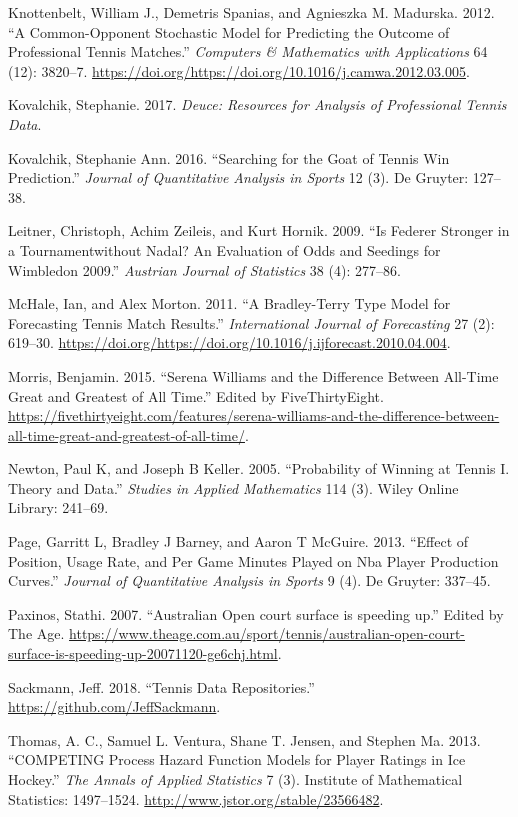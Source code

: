 \documentclass[]{article}
\begin{document}
\leavevmode\hypertarget{ref-knottenbelt2012}{}%
Knottenbelt, William J., Demetris Spanias, and Agnieszka M. Madurska.
2012. ``A Common-Opponent Stochastic Model for Predicting the Outcome of
Professional Tennis Matches.'' \emph{Computers \& Mathematics with
Applications} 64 (12): 3820--7.
\url{https://doi.org/https://doi.org/10.1016/j.camwa.2012.03.005}.

\leavevmode\hypertarget{ref-deuce2017}{}%
Kovalchik, Stephanie. 2017. \emph{Deuce: Resources for Analysis of
Professional Tennis Data}.

\leavevmode\hypertarget{ref-kovalchik2016}{}%
Kovalchik, Stephanie Ann. 2016. ``Searching for the Goat of Tennis Win
Prediction.'' \emph{Journal of Quantitative Analysis in Sports} 12 (3).
De Gruyter: 127--38.

\leavevmode\hypertarget{ref-leitner2009}{}%
Leitner, Christoph, Achim Zeileis, and Kurt Hornik. 2009. ``Is Federer
Stronger in a Tournamentwithout Nadal? An Evaluation of Odds and
Seedings for Wimbledon 2009.'' \emph{Austrian Journal of Statistics} 38
(4): 277--86.

\leavevmode\hypertarget{ref-mchale2011}{}%
McHale, Ian, and Alex Morton. 2011. ``A Bradley-Terry Type Model for
Forecasting Tennis Match Results.'' \emph{International Journal of
Forecasting} 27 (2): 619--30.
\url{https://doi.org/https://doi.org/10.1016/j.ijforecast.2010.04.004}.

\leavevmode\hypertarget{ref-five2015}{}%
Morris, Benjamin. 2015. ``Serena Williams and the Difference Between
All-Time Great and Greatest of All Time.'' Edited by FiveThirtyEight.
\url{https://fivethirtyeight.com/features/serena-williams-and-the-difference-between-all-time-great-and-greatest-of-all-time/}.

\leavevmode\hypertarget{ref-newton2005}{}%
Newton, Paul K, and Joseph B Keller. 2005. ``Probability of Winning at
Tennis I. Theory and Data.'' \emph{Studies in Applied Mathematics} 114
(3). Wiley Online Library: 241--69.

\leavevmode\hypertarget{ref-page2013}{}%
Page, Garritt L, Bradley J Barney, and Aaron T McGuire. 2013. ``Effect
of Position, Usage Rate, and Per Game Minutes Played on Nba Player
Production Curves.'' \emph{Journal of Quantitative Analysis in Sports} 9
(4). De Gruyter: 337--45.

\leavevmode\hypertarget{ref-theage2007}{}%
Paxinos, Stathi. 2007. ``Australian Open court surface is speeding up.''
Edited by The Age.
\url{https://www.theage.com.au/sport/tennis/australian-open-court-surface-is-speeding-up-20071120-ge6chj.html}.

\leavevmode\hypertarget{ref-sackmann2018}{}%
Sackmann, Jeff. 2018. ``Tennis Data Repositories.''
\url{https://github.com/JeffSackmann}.

\leavevmode\hypertarget{ref-thomas2013}{}%
Thomas, A. C., Samuel L. Ventura, Shane T. Jensen, and Stephen Ma. 2013.
``COMPETING Process Hazard Function Models for Player Ratings in Ice
Hockey.'' \emph{The Annals of Applied Statistics} 7 (3). Institute of
Mathematical Statistics: 1497--1524.
\url{http://www.jstor.org/stable/23566482}.
\end{document}
